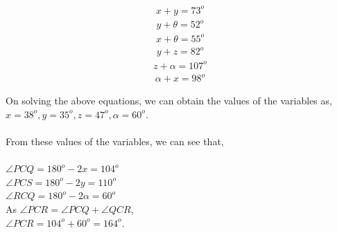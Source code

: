 \documentclass[journal,12pt,twocolumn]{IEEEtran}
\begin{document}
\begin{align}
    x + y = 73^o
\end{align}
\begin{align}
    y + \theta = 52^o
\end{align}
\begin{align}
    x + \theta = 55^o
\end{align}
\begin{align}
    y + z = 82^o
\end{align}
\begin{align}
    z + \alpha = 107^o
\end{align}
\begin{align}
    \alpha + x = 98^o
\end{align}

On solving the above equations, we can obtain the values of the variables as, $x = 38^o, y = 35^o, z = 47^o, \alpha = 60^o .$\\\\
From these values of the variables, we can see that,\\\\
$\angle PCQ = 180^o - 2x = 104^o$\\
$\angle PCS = 180^o - 2y = 110^o$\\
$\angle RCQ = 180^o - 2\alpha = 60^o$\\
As $\angle PCR = \angle PCQ +\angle QCR$,\\ $\angle PCR = 104^o + 60^o = 164^o$.\\\\
\end{document}
